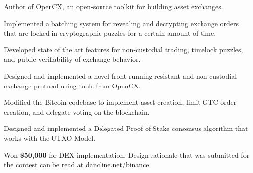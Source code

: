 
\begin{tightemize}
  \item Author of OpenCX, an open-source toolkit for building asset exchanges.
  \item Implemented a batching system for revealing and decrypting exchange orders that are locked in cryptographic puzzles for a certain amount of time.
  \item Developed state of the art features for non-custodial trading,
      timelock puzzles, and public verifiability of exchange behavior.
  \item Designed and implemented a novel front-running resistant and non-custodial exchange protocol using tools from OpenCX.
\end{tightemize}
\subsectionsep


\begin{tightemize}
  \item Modified the Bitcoin codebase to implement asset creation, limit GTC
    order creation, and delegate voting on the blockchain.
  \item Designed and implemented a Delegated Proof of
      Stake consensus algorithm that works with the UTXO Model.
  \item Won \textbf{\$50,000} for DEX implementation.
    Design rationale that was submitted for the contest can be read at
    \href{https://dancline.net/binance/}{dancline.net/binance}.
\end{tightemize}
